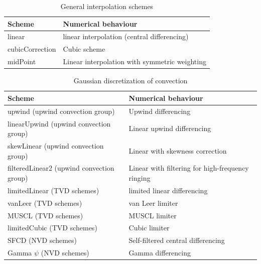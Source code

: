 \documentclass[a4paper,12pt]{article}
\begin{document}
\begin{table}[H]
\centering
\begin{tabular}{ll}
\toprule
Scheme          & Numerical behaviour                           \\ \midrule
linear          & linear interpolation (central differencing)   \\
cubicCorrection & Cubic scheme                                  \\
midPoint        & Linear interpolation with symmetric weighting \\ \bottomrule
\end{tabular}
\caption{General interpolation schemes}
\label{table:interpolation_general}
\end{table}

\begin{table}[H]
\centering
\begin{tabular}{ll}
\toprule
Scheme                                    & Numerical behaviour                              \\ \midrule
upwind (upwind convection group)          & Upwind differencing                              \\
linearUpwind (upwind convection group)    & Linear upwind differencing                       \\
skewLinear (upwind convection group)      & Linear with skewness correction                  \\
filteredLinear2 (upwind convection group) & Linear with filtering for high-frequency ringing \\
limitedLinear (TVD schemes)               & limited linear differencing                      \\
vanLeer (TVD schemes)                     & van Leer limiter                                 \\
MUSCL (TVD schemes)                       & MUSCL limiter                                    \\
limitedCubic (TVD schemes)                & Cubic limiter                                    \\
SFCD (NVD schemes)                        & Self-filtered central differencing               \\
Gamma $\psi$  (NVD schemes)               & Gamma differencing                               \\ \bottomrule
\end{tabular}
\caption{Gaussian discretization of convection}
\label{table:interpolation_convection}
\end{table}
\end{document}
